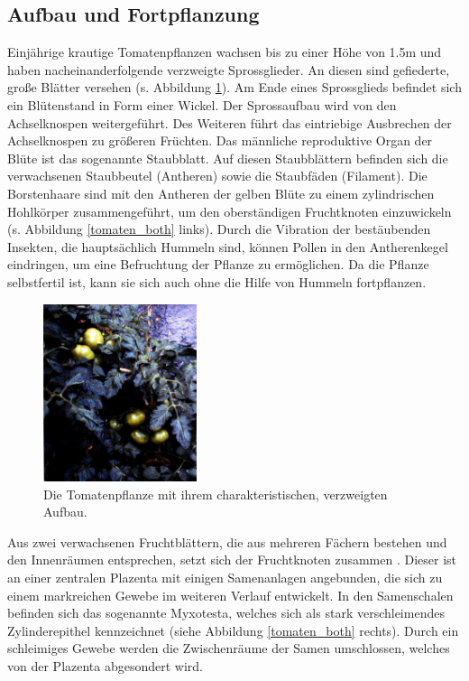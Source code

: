\subsection{Aufbau und Fortpflanzung}


Einjährige krautige Tomatenpflanzen wachsen bis zu einer Höhe von 1.5m und haben nacheinanderfolgende verzweigte Sprossglieder. An diesen sind gefiederte, große Blätter versehen (s. Abbildung \ref{tomaten_aufbau}). Am Ende eines Sprossglieds befindet sich ein Blütenstand in Form einer Wickel. Der Sprossaufbau wird von den Achselknospen weitergeführt. Des Weiteren führt das eintriebige Ausbrechen der Achselknospen zu größeren Früchten. Das männliche reproduktive Organ der Blüte ist das sogenannte Staubblatt. Auf diesen Staubblättern befinden sich die verwachsenen Staubbeutel (Antheren) sowie die Staubfäden (Filament)\cite{Bluete}. Die Borstenhaare sind mit den Antheren der gelben Blüte zu einem zylindrischen Hohlkörper zusammengeführt, um den oberständigen Fruchtknoten einzuwickeln (s. Abbildung \ref{tomaten_both} links). Durch die Vibration der bestäubenden Insekten, die hauptsächlich Hummeln sind, können Pollen in den Antherenkegel eindringen, um eine Befruchtung der Pflanze zu ermöglichen. Da die Pflanze selbstfertil ist, kann sie sich auch ohne die Hilfe von Hummeln fortpflanzen.   

\begin{figure}
	\centering
	\includegraphics[width=0.4\textwidth]{bilder/nutzpfl_1.jpg}%
	\caption{Die Tomatenpflanze mit ihrem charakteristischen, verzweigten Aufbau\cite{nutzpflanzen}.}
	\label{tomaten_aufbau}
\end{figure}


Aus zwei verwachsenen Fruchtblättern, die aus mehreren Fächern bestehen und den Innenräumen entsprechen, setzt sich der Fruchtknoten zusammen \cite{Bluete, nutzpflanzen}. Dieser ist an einer zentralen Plazenta mit einigen Samenanlagen angebunden, die sich zu einem markreichen Gewebe im weiteren Verlauf entwickelt. In den Samenschalen befinden sich das sogenannte Myxotesta, welches sich als stark verschleimendes Zylinderepithel kennzeichnet (siehe Abbildung \ref{tomaten_both} rechts). Durch ein schleimiges Gewebe werden die Zwischenräume der Samen umschlossen, welches von der Plazenta abgesondert wird.


